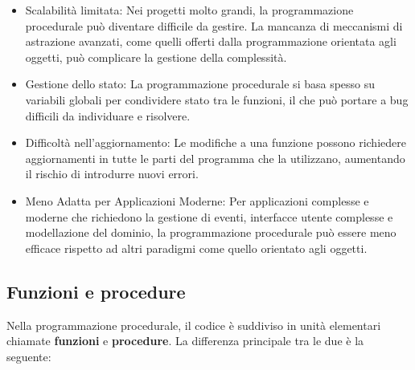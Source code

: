 \documentclass[
  letterpaper,
]{scrbook}
\providecommand{\tightlist}{%
  \setlength{\itemsep}{0pt}\setlength{\parskip}{0pt}}\usepackage{longtable,booktabs,array}
\begin{document}
\begin{itemize}
\tightlist
\item
  Scalabilità limitata: Nei progetti molto grandi, la programmazione
  procedurale può diventare difficile da gestire. La mancanza di
  meccanismi di astrazione avanzati, come quelli offerti dalla
  programmazione orientata agli oggetti, può complicare la gestione
  della complessità.
\item
  Gestione dello stato: La programmazione procedurale si basa spesso su
  variabili globali per condividere stato tra le funzioni, il che può
  portare a bug difficili da individuare e risolvere.
\item
  Difficoltà nell'aggiornamento: Le modifiche a una funzione possono
  richiedere aggiornamenti in tutte le parti del programma che la
  utilizzano, aumentando il rischio di introdurre nuovi errori.
\item
  Meno Adatta per Applicazioni Moderne: Per applicazioni complesse e
  moderne che richiedono la gestione di eventi, interfacce utente
  complesse e modellazione del dominio, la programmazione procedurale
  può essere meno efficace rispetto ad altri paradigmi come quello
  orientato agli oggetti.
\end{itemize}

\subsection{Funzioni e procedure}\label{funzioni-e-procedure}

Nella programmazione procedurale, il codice è suddiviso in unità
elementari chiamate \textbf{funzioni} e \textbf{procedure}. La
differenza principale tra le due è la seguente:
\end{document}
